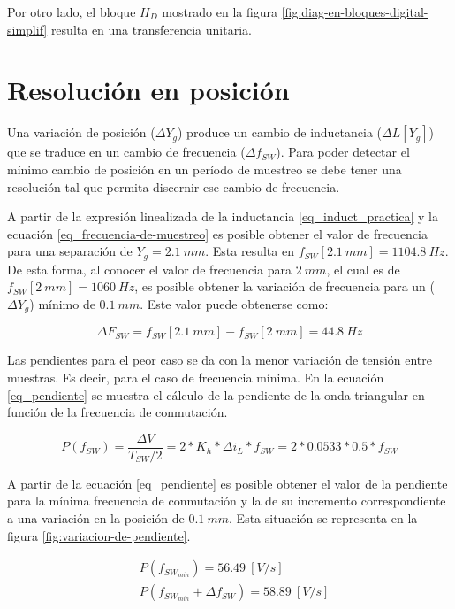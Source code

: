 \noindent Por otro lado, el bloque $H_D$ mostrado en la figura \ref{fig:diag-en-bloques-digital-simplif} resulta en una transferencia unitaria.

\section{Resolución en posición}

\noindent Una variación de posición ($\Delta Y_g$) produce un cambio de inductancia ($\Delta L[Y_g]$) que se traduce en un cambio de frecuencia ($\Delta f_{SW}$). Para poder detectar el mínimo cambio de posición en un período de muestreo se debe tener una resolución tal que permita discernir ese cambio de frecuencia.


\noindent A partir de la expresión linealizada de la inductancia \ref{eq_induct_practica} y la ecuación \ref{eq_frecuencia-de-muestreo} es posible obtener el valor de frecuencia para una separación de $Y_g=2.1\:mm$. Esta resulta en $f_{SW}[2.1\:mm] = 1104.8\:Hz$. De esta forma, al conocer el valor de frecuencia para $2\:mm$, el cual es de $f_{SW}[2\:mm] = 1060\:Hz$, es posible obtener la variación de frecuencia para un ($\Delta Y_g$) mínimo de  $0.1\:mm$. Este valor puede obtenerse como:

\begin{equation} 
	\Delta F_{SW} = f_{SW}[2.1\:mm] - f_{SW}[2\:mm] = 44.8\:Hz
\end{equation}

\noindent Las pendientes para el peor caso se da con la menor variación de tensión entre muestras. Es decir, para el caso de frecuencia mínima. En la ecuación \ref{eq_pendiente} se muestra el cálculo de la pendiente de la onda triangular en función de la frecuencia de conmutación.

\begin{equation} \label{eq_pendiente}
	P(f_{SW}) = \frac{\Delta V}{T_{SW}/2} = 2*K_h*\Delta i_L*f_{SW} = 2 * 0.0533 * 0.5 * f_{SW}
\end{equation}

\noindent A partir de la ecuación \ref{eq_pendiente} es posible obtener el valor de la pendiente para la mínima frecuencia de conmutación y la de su incremento correspondiente a una variación en la posición de $0.1\:mm$. Esta situación se representa en la figura \ref{fig:variacion-de-pendiente}.

\begin{equation} 
	\begin{aligned}
		&P(f_{SW_{min}}) = 56.49\:[V/s] \\
		&P(f_{SW_{min}} + \Delta f_{SW}) = 58.89\:[V/s] \\
	\end{aligned}
\end{equation}

